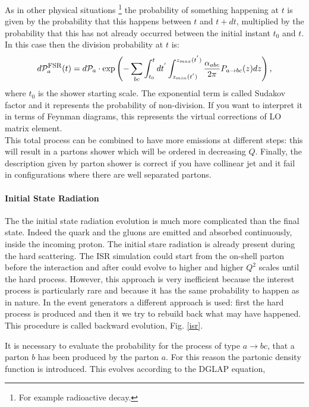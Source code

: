 As in other physical situations \footnote{For example radioactive decay.} the probability of something happening at $ t $ is given by the probability that this happens between $ t $ and $ t + dt $, multiplied by the probability that this has not already occurred between the initial instant $ t_0 $ and $ t $.
In this case then the  division probability  at $ t $ is:
\begin{equation}
 d \mathcal{P}_{a}^{\mbox{\footnotesize{FSR}}}(t)=   d \mathcal{P}_{a} \cdot \mbox{exp} \left(   -\sum_{bc} \int_{t_0}^t dt^{'}  \int_{z_{min}(t^{'})}^{{z_{max}(t^{'})}} \frac{\alpha_{abc}}{2 \pi} P_{a \rightarrow bc}(z) dz \right) \mbox{,}\end{equation}
where $t_{0}$ is the shower starting scale. 
The exponential term is called Sudakov factor and it represents the probability of non-division. 
If you want to interpret it in terms of Feynman diagrams, this represents the virtual corrections of LO matrix element. \\
This total process can be combined to have more emissions at different steps: this will result in a partons  shower which will be ordered in decreasing $ Q $. 
Finally,  the description given by parton shower is correct if you have collinear jet and it fail in configurations where there are well separated partons.   

\paragraph{Initial State Radiation}
The   the initial state radiation evolution is much more complicated than the final state. 
Indeed the quark and the gluons are   emitted  and absorbed continuously, inside the incoming proton. The initial stare radiation is already present during the hard scattering.
The ISR simulation could start from the on-shell parton before the interaction and after  could evolve to higher and higher $ Q ^ 2 $ scales until the hard process.
However, this approach is very inefficient because the  interest process  is particularly rare and because  it has the same probability to happen as in nature. 
In the event generators a different approach is  used: first the hard process is produced and then it we try to rebuild back what may have happened. 
This procedure is called backward evolution, Fig. \ref{isr}.

It is necessary to evaluate the  probability for the process of type $ a \rightarrow bc $,  that a parton $ b $ has  been produced by the parton $ a $.
For this reason the  partonic density function is introduced.  This evolves according to the DGLAP \cite{Altarelli: 1977zs} equation,

